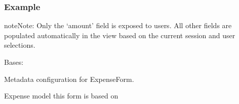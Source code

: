 \documentclass[letterpaper,10pt,english]{sphinxmanual}
\begin{document}
\begin{fulllineitems}
\begin{description}
\begin{itemize}
\end{itemize}

\end{description}
\subsubsection*{Example}

\begin{sphinxVerbatim}[commandchars=\\\{\}]
  
 
      
      
      
      
    
\end{sphinxVerbatim}

\begin{sphinxadmonition}{note}{Note:}
\sphinxAtStartPar
Only the ‘amount’ field is exposed to users. All other fields
are populated automatically in the view based on the current
session and user selections.
\end{sphinxadmonition}

\begin{fulllineitems}
\label{\detokenize{expensesApp:expensesApp.froms.ExpenseForm.Meta}}
\pysigstartsignatures
\pysigline
{}
\pysigstopsignatures
\sphinxAtStartPar
Bases: 

\sphinxAtStartPar
Metadata configuration for ExpenseForm.

\begin{fulllineitems}
\label{\detokenize{expensesApp:expensesApp.froms.ExpenseForm.Meta.model}}
\pysigstartsignatures
\pysigline
{}
\pysigstopsignatures
\sphinxAtStartPar
Expense model this form is based on


\end{fulllineitems}
\end{fulllineitems}
\end{fulllineitems}
\end{document}
